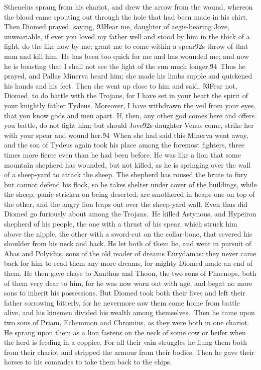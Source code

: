 {Sthenelus sprang from his chariot, and drew the arrow from the wound, whereon the blood came spouting out through the hole that had been made in his shirt. Then Diomed prayed, saying, \'93Hear me, daughter of aegis-bearing Jove, unweariable, if ever you loved my father well and stood by him in the thick of a fight, do the like now by me; grant me to come within a spear\'92s throw of that man and kill him. He has been too quick for me and has wounded me; and now he is boasting that I shall not see the light of the sun much longer.\'94\
Thus he prayed, and Pallas Minerva heard him; she made his limbs supple and quickened his hands and his feet. Then she went up close to him and said, \'93Fear not, Diomed, to do battle with the Trojans, for I have set in your heart the spirit of your knightly father Tydeus. Moreover, I have withdrawn the veil from your eyes, that you know gods and men apart. If, then, any other god comes here and offers you battle, do not fight him; but should Jove\'92s daughter Venus come, strike her with your spear and wound her.\'94\
When she had said this Minerva went away, and the son of Tydeus again took his place among the foremost fighters, three times more fierce even than he had been before. He was like a lion that some mountain shepherd has wounded, but not killed, as he is springing over the wall of a sheep-yard to attack the sheep. The shepherd has roused the brute to fury but cannot defend his flock, so he takes shelter under cover of the buildings, while the sheep, panic-stricken on being deserted, are smothered in heaps one on top of the other, and the angry lion leaps out over the sheep-yard wall. Even thus did Diomed go furiously about among the Trojans.\
He killed Astynous, and Hypeiron shepherd of his people, the one with a thrust of his spear, which struck him above the nipple, the other with a sword-cut on the collar-bone, that severed his shoulder from his neck and back. He let both of them lie, and went in pursuit of Abas and Polyidus, sons of the old reader of dreams Eurydamas: they never came back for him to read them any more dreams, for mighty Diomed made an end of them. He then gave chase to Xanthus and Thoon, the two sons of Phaenops, both of them very dear to him, for he was now worn out with age, and begat no more sons to inherit his possessions. But Diomed took both their lives and left their father sorrowing bitterly, for he nevermore saw them come home from battle alive, and his kinsmen divided his wealth among themselves.\
Then he came upon two sons of Priam, Echemmon and Chromius, as they were both in one chariot. He sprang upon them as a lion fastens on the neck of some cow or heifer when the herd is feeding in a coppice. For all their vain struggles he flung them both from their chariot and stripped the armour from their bodies. Then he gave their horses to his comrades to take them back to the ships.\
}
